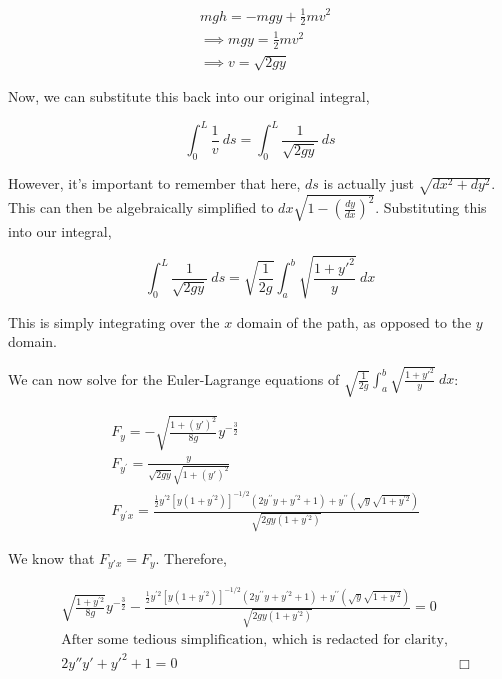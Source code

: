 \documentclass[%
 amsmath,amssymb,
aps,
 fleqn,
 notitlepage,
]{revtex4-2}
\begin{document}
\begin{align*}
    &mgh = -mgy + \frac12 mv^2\\
    &\implies mgy = \frac12 mv^2\\
    &\implies v = \sqrt{2gy}
\end{align*}

Now, we can substitute this back into our original integral,

\[\int_0^L \frac 1v ~ ds = \int_0^L \frac{1}{\sqrt{2gy}} ~ ds\]

However, it's important to remember that here, $ds$ is actually just $\sqrt{dx^2 + dy^2}$.  This can then be algebraically simplified to $dx\sqrt{1 - \left(\frac{dy}{dx}\right)^2}$.  Substituting this into our integral,

\[\int_0^L \frac{1}{\sqrt{2gy}} ~ ds = \sqrt{\frac{1}{2g}} \int_a^b \sqrt{\frac{1 + y'^2}{y}} ~ dx\]

This is simply integrating over the $x$ domain of the path, as opposed to the $y$ domain.

We can now solve for the Euler-Lagrange equations of $\displaystyle \sqrt{\frac{1}{2g}} \int_a^b \sqrt{\frac{1 + y'^2}{y}} ~ dx$:

\begin{align*}
    &F_{y}=-\sqrt{\frac{1+(y')^2}{8 g}} y^{-\frac32}\\
    &F_{y^{\prime}}=\frac{y}{\sqrt{2 g y} \sqrt{1+(y')^2}}\\
    &F_{y^{\prime} x}=\frac{\frac{1}{2} y^{\prime 2}\left[y\left(1+y^{\prime 2}\right)\right]^{-1 / 2}\left(2 y^{\prime \prime} y+y^{\prime 2}+1\right)+y^{\prime \prime}(\sqrt{y} \sqrt{1+y^{\prime 2}})}{\sqrt{2 g y\left(1+y^{\prime 2}\right)}}
\end{align*}

We know that $F_{y'x} = F_y$.  Therefore, %

\begin{align*}
    &\sqrt{\frac{1+y^{\prime 2}}{8 g}} y^{-\frac{3}{2}}-\frac{\frac{1}{2} y^{\prime 2}\left[y\left(1+y^{\prime 2}\right)\right]^{-1 / 2}\left(2 y^{\prime \prime} y+y^{\prime 2}+1\right)+y^{\prime \prime}(\sqrt{y} \sqrt{1+y^{\prime 2}})}{\sqrt{2 g y\left(1+y^{\prime 2}\right)}}=0\\
    &\text{After some tedious simplification, which is redacted for clarity,}\\
    &2y''y' + y'^2 + 1 = 0 & \Box
\end{align*}
\end{document}
